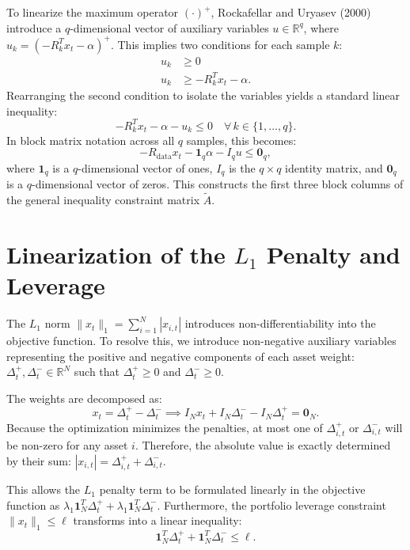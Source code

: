 To linearize the maximum operator $(\cdot)^+$, Rockafellar and Uryasev (2000) introduce a $q$-dimensional vector of auxiliary variables $u \in \mathbb{R}^q$, where $u_k = (-R_k^T x_t - \alpha)^+$. This implies two conditions for each sample $k$:
\begin{align*}
    u_k &\ge 0 \\
    u_k &\ge -R_k^T x_t - \alpha.
\end{align*}
Rearranging the second condition to isolate the variables yields a standard linear inequality:
\begin{equation} \label{eq:es_inequality}
    - R_k^T x_t - \alpha - u_k \le 0 \quad \forall \, k \in \{1, \dots, q\}.
\end{equation}
In block matrix notation across all $q$ samples, this becomes:
\begin{equation*}
    -R_{\text{data}} x_t - \mathbf{1}_q \alpha - I_q u \le \mathbf{0}_q,
\end{equation*}
where $\mathbf{1}_q$ is a $q$-dimensional vector of ones, $I_q$ is the $q \times q$ identity matrix, and $\mathbf{0}_q$ is a $q$-dimensional vector of zeros. This constructs the first three block columns of the general inequality constraint matrix $\tilde{A}$.

\section{Linearization of the $L_1$ Penalty and Leverage}

The $L_1$ norm $\|x_t\|_1 = \sum_{i=1}^N |x_{i,t}|$ introduces non-differentiability into the objective function. To resolve this, we introduce non-negative auxiliary variables representing the positive and negative components of each asset weight: $\Delta^+_t, \Delta^-_t \in \mathbb{R}^N$ such that $\Delta^+_t \ge 0$ and $\Delta^-_t \ge 0$. 

The weights are decomposed as:
\begin{equation} \label{eq:weight_decomp}
    x_t = \Delta^+_t - \Delta^-_t \implies I_N x_t + I_N \Delta^-_t - I_N \Delta^+_t = \mathbf{0}_N.
\end{equation}
Because the optimization minimizes the penalties, at most one of $\Delta^+_{i,t}$ or $\Delta^-_{i,t}$ will be non-zero for any asset $i$. Therefore, the absolute value is exactly determined by their sum: $|x_{i,t}| = \Delta^+_{i,t} + \Delta^-_{i,t}$.

This allows the $L_1$ penalty term to be formulated linearly in the objective function as $\lambda_1 \mathbf{1}_N^T \Delta^+_t + \lambda_1 \mathbf{1}_N^T \Delta^-_t$. Furthermore, the portfolio leverage constraint $\|x_t\|_1 \le \ell$ transforms into a linear inequality:
\begin{equation} \label{eq:leverage_inequality}
    \mathbf{1}_N^T \Delta^+_t + \mathbf{1}_N^T \Delta^-_t \le \ell.
\end{equation}

